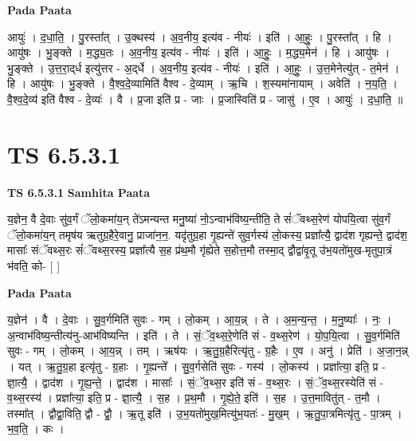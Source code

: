 \documentclass[17pt]{extarticle}
\begin{document}
\textbf{Pada Paata} \newline

आयुः॑ । द॒धा॒ति॒ । पु॒रस्ता᳚त् । उ॒क्थस्य॑ । अ॒व॒नीय॒ इत्य॑व - नीयः॑ । इति॑ । आ॒हुः॒ । पु॒रस्ता᳚त् । हि । आयु॑षः । भु॒ङ्क्ते । म॒द्ध्य॒तः । अ॒व॒नीय॒ इत्य॑व - नीयः॑ । इति॑ । आ॒हुः॒ । म॒द्ध्य॒मेन॑ । हि । आयु॑षः । भु॒ङ्क्ते । उ॒त्त॒रा॒द्‌र्ध इत्यु॑त्तर - अ॒द्‌र्धे । अ॒व॒नीय॒ इत्य॑व - नीयः॑ । इति॑ । आ॒हुः॒ । उ॒त्त॒मेनेत्यु॑त् - त॒मेन॑ । हि । आयु॑षः । भु॒ङ्क्ते । वै॒श्व॒दे॒व्यामिति॑ वैश्व - दे॒व्याम् । ऋ॒चि । श॒स्यमा॑नायाम् । अवेति॑ । न॒य॒ति॒ । वै॒श्व॒दे॒व्य॑ इति॑ वैश्व - दे॒व्यः॑ । वै । प्र॒जा इति॑ प्र - जाः । प्र॒जास्विति॑ प्र - जासु॑ । ए॒व । आयुः॑ । द॒धा॒ति॒ ॥  \newline





\section{ TS 6.5.3.1 }

\textbf{TS 6.5.3.1 } \newline
\textbf{Samhita Paata} \newline

य॒ज्ञेन॒ वै दे॒वाः सु॑व॒र्गं ॅलो॒कमा॑य॒न् ते॑ऽमन्यन्त मनु॒ष्या॑ नो॒ऽन्वाभ॑विष्य॒न्तीति॒ ते सं॑ॅवथ्स॒रेण॑ योपयि॒त्वा सु॑व॒र्गं ॅलो॒कमा॑य॒न् तमृष॑य ऋतुग्र॒हैरे॒वानु॒ प्राजा॑न॒न॒. यदृ॑तुग्र॒हा गृ॒ह्यन्ते॑ सुव॒र्गस्य॑ लो॒कस्य॒ प्रज्ञा᳚त्यै॒ द्वाद॑श गृह्यन्ते॒ द्वाद॑श॒ मासाः᳚ संॅवथ्स॒रः सं॑ॅवथ्स॒रस्य॒ प्रज्ञा᳚त्यै स॒ह प्र॑थ॒मौ गृ॑ह्येते स॒होत्त॒मौ तस्मा॒द् द्वौद्वा॑वृ॒तू उ॑भ॒यतो॑मुख-मृतुपा॒त्रं भ॑वति॒ को- [  ] \newline

\textbf{Pada Paata} \newline

य॒ज्ञेन॑ । वै । दे॒वाः । सु॒व॒र्गमिति॑ सुवः - गम् । लो॒कम् । आ॒य॒न्न् । ते । अ॒म॒न्य॒न्त॒ । म॒नु॒ष्याः᳚ । नः॒ । अ॒न्वाभ॑विष्य॒न्तीत्य॑नु-आभ॑विष्यन्ति । इति॑ । ते । सं॒ॅव॒थ्स॒रे॒णेति॑ सं - व॒थ्स॒रेण॑ । यो॒प॒यि॒त्वा । सु॒व॒र्गमिति॑ सुवः - गम् । लो॒कम् । आ॒य॒न्न् । तम् । ऋष॑यः । ऋ॒तु॒ग्र॒हैरित्यृ॑तु - ग्र॒हैः । ए॒व । अनु॑ । प्रेति॑ । अ॒जा॒न॒न्न् । यत् । ऋ॒तु॒ग्र॒हा इत्यृ॑तु - ग्र॒हाः । गृ॒ह्यन्ते᳚ । सु॒व॒र्गसेति॑ सुवः - गस्य॑ । लो॒कस्य॑ । प्रज्ञा᳚त्या॒ इति॒ प्र - ज्ञा॒त्यै॒ । द्वाद॑श । गृ॒ह्य॒न्ते॒ । द्वाद॑श । मासाः᳚ । सं॒ॅव॒थ्स॒र इति॑ सं - व॒थ्स॒रः । सं॒ॅव॒थ्स॒रस्येति॑ सं - व॒थ्स॒रस्य॑ । प्रज्ञा᳚त्या॒ इति॒ प्र - ज्ञा॒त्यै॒ । स॒ह । प्र॒थ॒मौ । गृ॒ह्ये॒ते॒ इति॑ । स॒ह । उ॒त्त॒मावितु॑त् - त॒मौ । तस्मा᳚त् । द्वौद्वा॒विति॒ द्वौ - द्वौ॒ । ऋ॒तू इति॑ । उ॒भ॒यतो॑मुख॒मित्यु॑भ॒यतः॑ - मु॒ख॒म् । ऋ॒तु॒पा॒त्रमित्यृ॑तु - पा॒त्रम् । भ॒व॒ति॒ । कः ।  \newline
\end{document}
